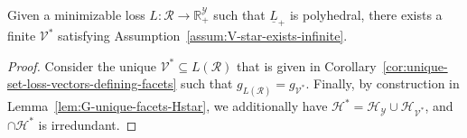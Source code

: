 \documentclass[twoside,11pt]{article}
\newcommand{\Comments}{1}
\newcommand{\mynote}[2]{\ifnum\Comments=1\textcolor{#1}{#2}\fi}
\newcommand{\raf}[1]{\mynote{darkgreen}{[RF: #1]}}
\newcommand{\jessie}[1]{\mynote{teal}{[JF: #1]}}
\newcommand{\reals}{\mathbb{R}}
\renewcommand{\H}{\mathcal{H}}
\newcommand{\R}{\mathcal{R}}
\newcommand{\V}{\mathcal{V}}
\newcommand{\Y}{\mathcal{Y}}
\newcommand{\risk}[1]{\underline{#1}}
\newcommand{\hyp}{\mathrm{hypo}}
\newtheorem{claim}{Claim}
\begin{document}
\begin{proposition}\label{prop:poly-risk-assumption-satisfied}
	Given a minimizable loss $L : \R \to \reals^\Y_+$ such that $\risk L_+$ is polyhedral, there exists a finite $\V^*$ satisfying Assumption~\ref{assum:V-star-exists-infinite}.
\end{proposition}
\begin{proof}
	Consider the unique $\V^* \subseteq L(\R)$ that is given in Corollary~\ref{cor:unique-set-loss-vectors-defining-facets} such that $g_{L(\R)} = g_{\V^*}$.
	Finally, by construction in Lemma~\ref{lem:G-unique-facets-Hstar}, we additionally have $\H^* = \H_\Y \cup \H_{\V^*}$, and $\cap \H^*$ is irredundant.
\end{proof}






\end{document}
